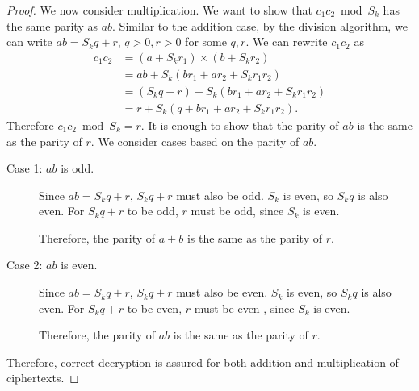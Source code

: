 \begin{proof}
	We now consider multiplication. We want to show that $c_1c_2 \bmod S_k$ has the same parity as $ab$. Similar to the addition case, by the division algorithm, we can write $ab = S_kq + r$, $q > 0, r > 0$ for some $q,r$. We can rewrite $c_1c_2$ as
	\begin{align*}
		c_1c_2 &= (a + S_kr_1) \times (b + S_kr_2)\\
		&= ab + S_k(br_1 + ar_2 + S_kr_1r_2)\\
		&= (S_kq + r) + S_k(br_1 + ar_2 + S_kr_1r_2)\\
		&= r + S_k(q + br_1 + ar_2 + S_kr_1r_2).
	\end{align*}
	Therefore $c_1c_2 \bmod S_k = r$.
	It is enough to show that the parity of $ab$ is the same as the parity of $r$. We consider cases based on the parity of $ab$.
	\begin{description}
		\item[Case 1: $ab$ is odd.]
			Since $ab = S_kq + r$, $S_kq + r$ must also be odd.
			$S_k$ is even, so $S_kq$ is also even.
			For $S_kq + r$ to be odd, $r$ must be odd, since $S_k$ is even.

			Therefore, the parity of $a+b$ is the same as the parity of $r$.
		\item[Case 2: $ab$ is even.]
			Since $ab = S_kq + r$, $S_kq + r$ must also be even.
			$S_k$ is even, so $S_kq$ is also even. For $S_kq + r$ to be even, $r$ must be even , since $S_k$ is even.

			Therefore, the parity of $ab$ is the same as the parity of $r$.
	\end{description}
	Therefore, correct decryption is assured for both addition and multiplication of ciphertexts.
\end{proof}
